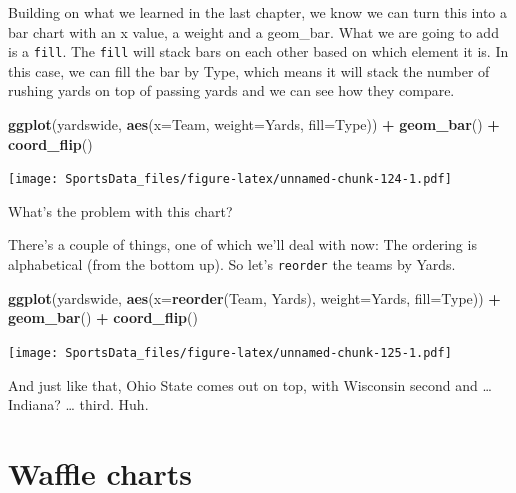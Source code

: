 \documentclass[
]{book}
\newenvironment{Shaded}{\begin{snugshade}}{\end{snugshade}}
\newcommand{\DataTypeTok}[1]{\textcolor[rgb]{0.13,0.29,0.53}{#1}}
\newcommand{\KeywordTok}[1]{\textcolor[rgb]{0.13,0.29,0.53}{\textbf{#1}}}
\newcommand{\NormalTok}[1]{#1}
\newcommand{\OperatorTok}[1]{\textcolor[rgb]{0.81,0.36,0.00}{\textbf{#1}}}
\newcommand{\StringTok}[1]{\textcolor[rgb]{0.31,0.60,0.02}{#1}}
\begin{document}
Building on what we learned in the last chapter, we know we can turn this into a bar chart with an x value, a weight and a geom\_bar. What we are going to add is a \texttt{fill}. The \texttt{fill} will stack bars on each other based on which element it is. In this case, we can fill the bar by Type, which means it will stack the number of rushing yards on top of passing yards and we can see how they compare.

\begin{Shaded}
\begin{Highlighting}[]
\KeywordTok{ggplot}\NormalTok{(yardswide, }\KeywordTok{aes}\NormalTok{(}\DataTypeTok{x=}\NormalTok{Team, }\DataTypeTok{weight=}\NormalTok{Yards, }\DataTypeTok{fill=}\NormalTok{Type)) }\OperatorTok{+}\StringTok{ }
\StringTok{  }\KeywordTok{geom_bar}\NormalTok{() }\OperatorTok{+}\StringTok{ }
\StringTok{  }\KeywordTok{coord_flip}\NormalTok{()}
\end{Highlighting}
\end{Shaded}

\texttt{[image: SportsData\_files/figure-latex/unnamed-chunk-124-1.pdf]}

What's the problem with this chart?

There's a couple of things, one of which we'll deal with now: The ordering is alphabetical (from the bottom up). So let's \texttt{reorder} the teams by Yards.

\begin{Shaded}
\begin{Highlighting}[]
\KeywordTok{ggplot}\NormalTok{(yardswide, }\KeywordTok{aes}\NormalTok{(}\DataTypeTok{x=}\KeywordTok{reorder}\NormalTok{(Team, Yards), }\DataTypeTok{weight=}\NormalTok{Yards, }\DataTypeTok{fill=}\NormalTok{Type)) }\OperatorTok{+}\StringTok{ }
\StringTok{  }\KeywordTok{geom_bar}\NormalTok{() }\OperatorTok{+}\StringTok{ }
\StringTok{  }\KeywordTok{coord_flip}\NormalTok{()}
\end{Highlighting}
\end{Shaded}

\texttt{[image: SportsData\_files/figure-latex/unnamed-chunk-125-1.pdf]}

And just like that, Ohio State comes out on top, with Wisconsin second and \ldots{} Indiana? \ldots{} third. Huh.

\hypertarget{waffle-charts}{%
\chapter{Waffle charts}\label{waffle-charts}}
\end{document}
